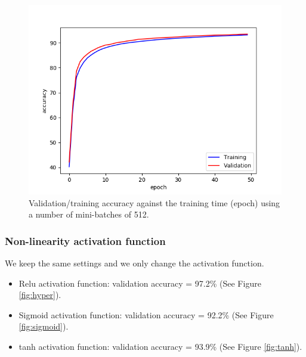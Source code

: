 \documentclass[a4paper]{article}
\begin{document}
\begin{enumerate}
\begin{figure}
\centering
\includegraphics[width=1\textwidth]{batch3.png}
\caption{\label{fig:batch3}Validation/training accuracy against the training time (epoch) using a number of mini-batches of 512.}
\end{figure}

\subsubsection{Non-linearity activation function}
We keep the same settings and we only change the activation function.

\begin{itemize}

\item Relu activation function: validation accuracy = 97.2\% (See Figure \ref{fig:hyper}).

\item Sigmoid activation function: validation accuracy = 92.2\% (See Figure \ref{fig:sigmoid}).

\item tanh activation function: validation accuracy = 93.9\% (See Figure \ref{fig:tanh}).  
  
\end{itemize}


\end{enumerate}
\end{document}

